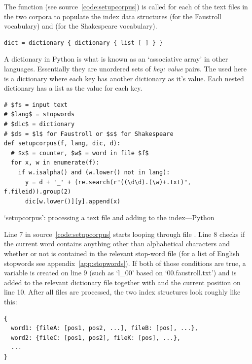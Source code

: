 The  function (see source~\ref{code:setupcorpus}) is called for each of the text files in the two corpora to populate the index data structures  (for the Faustroll vocabulary) and  (for the Shakespeare vocabulary).

\begin{verbatim}
dict = dictionary { dictionary { list [ ] } }
\end{verbatim}

A dictionary in Python is what is known as an `associative array' in other languages. Essentially they are unordered sets of \emph{key: value} pairs. The  used here is a dictionary where each key has another dictionary as it's value. Each nested dictionary has a list as the value for each key.

\begin{listing}[!htbp] %
  \begin{verbatim}
# $f$ = input text
# $lang$ = stopwords
# $dic$ = dictionary
# $d$ = $l$ for Faustroll or $s$ for Shakespeare
def setupcorpus(f, lang, dic, d):
  # $x$ = counter, $w$ = word in file $f$
  for x, w in enumerate(f):
    if w.isalpha() and (w.lower() not in lang):
      y = d + '_' + (re.search(r"((\d\d).(\w)+.txt)", f.fileid)).group(2)
      dic[w.lower()][y].append(x)
  \end{verbatim}
\caption[`setupcorpus' function---Python]{`setupcorpus': processing a text file and adding to the index---Python}
\label{code:setupcorpus}
\end{listing}

Line 7 in source~\ref{code:setupcorpus} starts looping through file . Line 8 checks if the current word  contains anything other than alphabetical characters and whether or not  is contained in the relevant stop-word file  (for a list of English stopwords see appendix~\ref{app:stopwords}). If both of those conditions are true, a variable  is created on line \num{9} (such as `l\_00' based on `00.faustroll.txt') and  is added to the relevant dictionary file  together with  and the current position  on line 10. After all files are processed, the two index structures look roughly like this:

\begin{verbatim}
{
  word1: {fileA: [pos1, pos2, ...], fileB: [pos], ...},
  word2: {fileC: [pos1, pos2], fileK: [pos], ...},
  ...
}
\end{verbatim}

